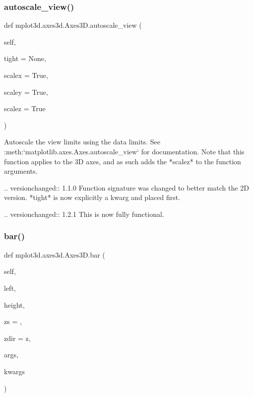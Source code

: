 \subsubsection{\texorpdfstring{autoscale\+\_\+view()}{autoscale\_view()}}
{\footnotesize\ttfamily def mplot3d.\+axes3d.\+Axes3\+D.\+autoscale\+\_\+view (\begin{DoxyParamCaption}\item[{}]{self,  }\item[{}]{tight = {\ttfamily None},  }\item[{}]{scalex = {\ttfamily True},  }\item[{}]{scaley = {\ttfamily True},  }\item[{}]{scalez = {\ttfamily True} }\end{DoxyParamCaption})}

\begin{DoxyVerb}Autoscale the view limits using the data limits.
See :meth:`matplotlib.axes.Axes.autoscale_view` for documentation.
Note that this function applies to the 3D axes, and as such
adds the *scalez* to the function arguments.

.. versionchanged:: 1.1.0
    Function signature was changed to better match the 2D version.
    *tight* is now explicitly a kwarg and placed first.

.. versionchanged:: 1.2.1
    This is now fully functional.
\end{DoxyVerb}
 \mbox{\label{classmplot3d_1_1axes3d_1_1Axes3D_a5c95436ac957d0360eaf62a49347a8f2}} 
\subsubsection{\texorpdfstring{bar()}{bar()}}
{\footnotesize\ttfamily def mplot3d.\+axes3d.\+Axes3\+D.\+bar (\begin{DoxyParamCaption}\item[{}]{self,  }\item[{}]{left,  }\item[{}]{height,  }\item[{}]{zs = {},  }\item[{}]{zdir = {\ttfamily \textquotesingle{}z\textquotesingle{}},  }\item[{}]{args,  }\item[{}]{kwargs }\end{DoxyParamCaption})}

